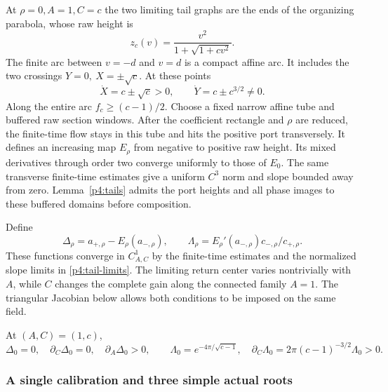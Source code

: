 At $\rho=0,A=1,C=c$ the two limiting tail graphs are the ends of
the organizing parabola, whose raw height is
\begin{equation}\label{p4:raw-organizing}
 z_c(v)=\frac{v^2}{1+\sqrt{1+cv^2}}.
\end{equation}
The finite arc between $v=-d$ and $v=d$ is a compact affine arc.
It includes the two crossings $Y=0,\ X=\pm\sqrt c$.
At these points
\[
 \dot X=c\pm\sqrt c>0,\qquad
 \dot Y=c\pm c^{3/2}\ne0.
\]
Along the entire arc $f_c\ge(c-1)/2$.
Choose a fixed narrow affine tube and buffered raw section windows.
After the coefficient rectangle and $\rho$ are reduced, the
finite-time flow stays in this tube and hits the positive port
transversely. It defines an increasing map $E_\rho$ from negative
to positive raw height. Its mixed derivatives through order two
converge uniformly to those of $E_0$.
The same transverse finite-time estimates give a uniform $C^3$ norm
and slope bounded away from zero.
Lemma~\ref{p4:tails} admits the port heights and all phase images to
these buffered domains before composition.

Define
\begin{equation}\label{p4:outer-data}
 \Delta_\rho=a_{+,\rho}-E_\rho(a_{-,\rho}),\qquad
 \Lambda_\rho=E_\rho'(a_{-,\rho})c_{-,\rho}/c_{+,\rho}.
\end{equation}
These functions converge in $C^1_{A,C}$ by the finite-time
estimates and the normalized slope limits in \eqref{p4:tail-limits}.
The limiting return center varies nontrivially with $A$, while $C$
changes the complete gain along the connected family $A=1$.
The triangular Jacobian below allows both conditions to be imposed
on the same field.

\begin{lemma}\label{p4:transverse-coefficients}
At $(A,C)=(1,c)$,
\begin{equation}\label{p4:Jacobian}
 \Delta_0=0,\quad \partial_C\Delta_0=0,\quad
 \partial_A\Delta_0>0,\qquad
 \Lambda_0=e^{-4\pi/\sqrt{c-1}},\quad
 \partial_C\Lambda_0=2\pi(c-1)^{-3/2}\Lambda_0>0.
\end{equation}
\end{lemma}



\subsubsection{A single calibration and three simple actual roots}

